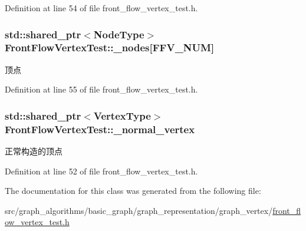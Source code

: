 Definition at line 54 of file front\+\_\+flow\+\_\+vertex\+\_\+test.\+h.

\hypertarget{class_front_flow_vertex_test_a87ecf1ffdaa2b7c78ba360b2deb4cfd1}{}
\subsubsection[{\+\_\+nodes}]{\setlength{\rightskip}{0pt plus 5cm}std\+::shared\+\_\+ptr$<${\bf Node\+Type}$>$ Front\+Flow\+Vertex\+Test\+::\+\_\+nodes\mbox{[}F\+F\+V\+\_\+\+N\+U\+M\mbox{]}\hspace{0.3cm}{\ttfamily [protected]}}\label{class_front_flow_vertex_test_a87ecf1ffdaa2b7c78ba360b2deb4cfd1}
顶点 

Definition at line 55 of file front\+\_\+flow\+\_\+vertex\+\_\+test.\+h.

\hypertarget{class_front_flow_vertex_test_a5f8a63b2d218d2e733e27ca598e9b864}{}
\subsubsection[{\+\_\+normal\+\_\+vertex}]{\setlength{\rightskip}{0pt plus 5cm}std\+::shared\+\_\+ptr$<${\bf Vertex\+Type}$>$ Front\+Flow\+Vertex\+Test\+::\+\_\+normal\+\_\+vertex\hspace{0.3cm}{\ttfamily [protected]}}\label{class_front_flow_vertex_test_a5f8a63b2d218d2e733e27ca598e9b864}
正常构造的顶点 

Definition at line 52 of file front\+\_\+flow\+\_\+vertex\+\_\+test.\+h.



The documentation for this class was generated from the following file\+:\begin{DoxyCompactItemize}
\item 
src/graph\+\_\+algorithms/basic\+\_\+graph/graph\+\_\+representation/graph\+\_\+vertex/\hyperlink{front__flow__vertex__test_8h}{front\+\_\+flow\+\_\+vertex\+\_\+test.\+h}\end{DoxyCompactItemize}
